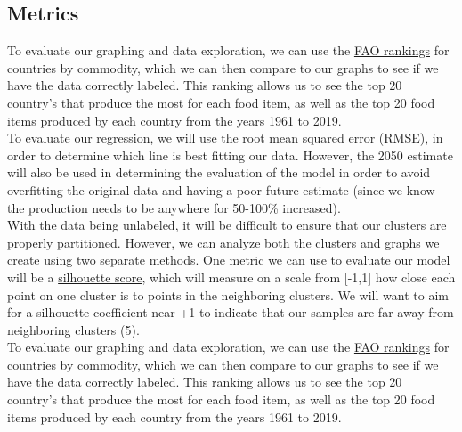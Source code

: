 \documentclass[12pt, a4paper]{article}
\begin{document}
\begin{spacing}{1.1}

	\subsection{Metrics}
	To evaluate our graphing and data exploration, we can use the \href{http://www.fao.org/faostat/en/#rankings/countries_by_commodity}{FAO rankings} for countries by commodity, which we can then compare to our graphs to see if we have the data correctly labeled. This ranking allows us to see the top 20 country's that produce the most for each food item, as well as the top 20 food items produced by each country from the years 1961 to 2019.\vspace*{2mm}\\
	To evaluate our regression, we will use the root mean squared error (RMSE), in order to determine which line is best fitting our data. However, the 2050 estimate will also be used in determining the evaluation of the model in order to avoid overfitting the original data and having a poor future estimate (since we know the production needs to be anywhere for 50-100\% increased). \vspace*{2mm}\\
	With the data being unlabeled, it will be difficult to ensure that our clusters are properly partitioned. However, we can analyze both the clusters and graphs we create using two separate methods. One metric we can use to evaluate our model will be a \href{https://scikit-learn.org/stable/auto_examples/cluster/plot_kmeans_silhouette_analysis.html}{silhouette score}, which will measure on a scale from [-1,1] how close each point on one cluster is to points in the neighboring clusters. We will want to aim for a silhouette coefficient near +1 to indicate that our samples are far away from neighboring clusters (5). \vspace*{2mm}\\
	To evaluate our graphing and data exploration, we can use the \href{http://www.fao.org/faostat/en/#rankings/countries_by_commodity}{FAO rankings} for countries by commodity, which we can then compare to our graphs to see if we have the data correctly labeled. This ranking allows us to see the top 20 country's that produce the most for each food item, as well as the top 20 food items produced by each country from the years 1961 to 2019. \vspace*{2mm}
	

\end{spacing}
\end{document}
